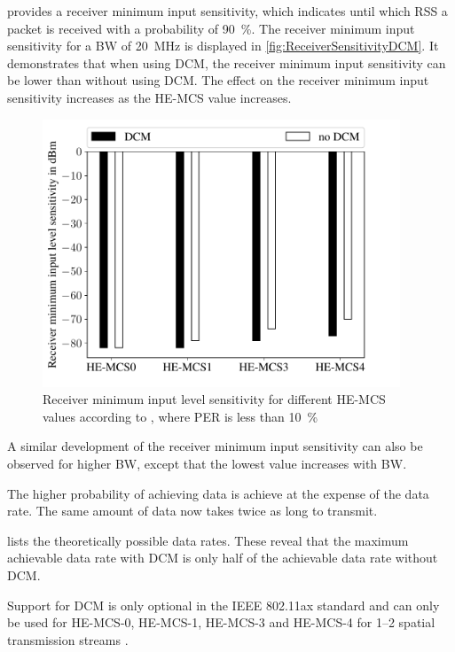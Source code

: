 \cite{noauthor_ieee_2021} provides a receiver minimum input sensitivity, which indicates until which RSS a packet is received with a probability of \SI{90}{\percent}. The receiver minimum input sensitivity for a \ac{BW} of \SI{20}{\mega\hertz} is displayed in \autoref{fig:ReceiverSensitivityDCM}. It demonstrates that when using \ac{DCM}, the receiver minimum input sensitivity can be lower than without using \ac{DCM}. The effect on the receiver minimum input sensitivity increases as the HE-MCS value increases.
\begin{figure}%
	\centering
	\includegraphics[width=0.95\textwidth]{figures/Receiver_minimum_DCM.pdf}
	\caption{Receiver minimum input level sensitivity for different HE-MCS values according to \cite{noauthor_ieee_2021}, where \ac{PER} is less than \SI{10}{\percent}}%
	\label{fig:ReceiverSensitivityDCM}%
\end{figure}

A similar development of the receiver minimum input sensitivity can also be observed for higher \ac{BW}, except that the lowest value increases with \ac{BW}.

The higher probability of achieving data is achieve at the expense of the data rate. The same amount of data now takes twice as long to transmit. 

\cite{noauthor_ieee_2021} lists the theoretically possible data rates. These reveal that the maximum achievable data rate with DCM is only half of the achievable data rate without DCM.

Support for \ac{DCM} is only optional in the IEEE 802.11ax standard and can only be used for HE-\ac{MCS}-\num{0}, HE-\ac{MCS}-\num{1}, HE-\ac{MCS}-\num{3} and HE-\ac{MCS}-\num{4} for \numrange{1}{2} spatial transmission streams \cite{noauthor_ieee_2021}.


